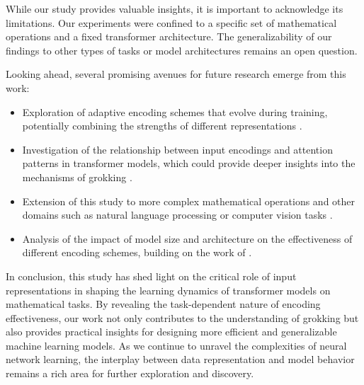\documentclass{article} %
\begin{document}
While our study provides valuable insights, it is important to acknowledge its limitations. Our experiments were confined to a specific set of mathematical operations and a fixed transformer architecture. The generalizability of our findings to other types of tasks or model architectures remains an open question.

Looking ahead, several promising avenues for future research emerge from this work:

\begin{itemize}
    \item Exploration of adaptive encoding schemes that evolve during training, potentially combining the strengths of different representations \cite{vaswani2017attention}.
    \item Investigation of the relationship between input encodings and attention patterns in transformer models, which could provide deeper insights into the mechanisms of grokking \cite{bahdanau2014neural}.
    \item Extension of this study to more complex mathematical operations and other domains such as natural language processing or computer vision tasks \cite{radford2019language}.
    \item Analysis of the impact of model size and architecture on the effectiveness of different encoding schemes, building on the work of \citet{paszke2019pytorch}.
\end{itemize}

In conclusion, this study has shed light on the critical role of input representations in shaping the learning dynamics of transformer models on mathematical tasks. By revealing the task-dependent nature of encoding effectiveness, our work not only contributes to the understanding of grokking but also provides practical insights for designing more efficient and generalizable machine learning models. As we continue to unravel the complexities of neural network learning, the interplay between data representation and model behavior remains a rich area for further exploration and discovery.



\end{document}
